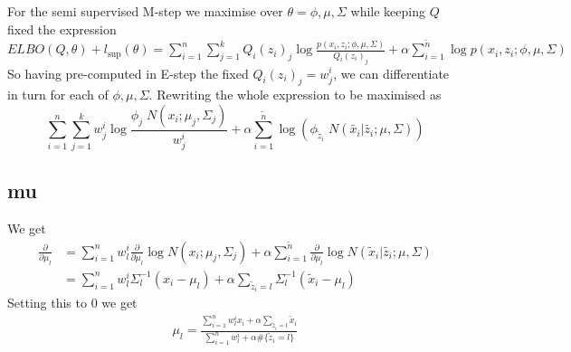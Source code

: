 %
%
\begin{answer}
For the semi supervised M-step we maximise over $\theta = \phi, \mu, \Sigma$ while keeping $Q$ fixed the expression $ELBO(Q, \theta) + l_{\text{sup}}(\theta) = \sum_{i=1}^n \sum_{j=1}^k Q_i(z_i)_j \log \frac{p(x_i,z_i; \phi, \mu, \Sigma)}{Q_i(z_i)_j} + \alpha \sum_{i=1}^{\tilde{n}} \log p(x_i, z_i; \phi, \mu, \Sigma)$
\linebreak
So having pre-computed in E-step the fixed $Q_i(z_i)_j = w^i_j$, we can differentiate in turn for each of $\phi, \mu, \Sigma$. Rewriting the whole expression to be maximised as
\begin{equation*}
\sum_{i=1}^n \sum_{j=1}^k w^i_j \log \frac{\phi_j \; N(x_i ; \mu_j, \Sigma_j)}{w^i_j} + \alpha \sum_{i=1}^{\tilde{n}} \log  \left ( \phi_{\tilde{z}_i} \; N(\tilde{x_i} | \tilde{z_i}; \mu, \Sigma) \right )
\end{equation*}
\subsection*{mu}
We get
\begin{align*}
\frac{\partial}{\partial \mu_l} &=
\sum_{i=1}^n w^i_l \frac{\partial}{\partial \mu_l} \log  N(x_i ; \mu_j, \Sigma_j) +
\alpha \sum_{i=1}^{\tilde{n}} \frac{\partial}{\partial \mu_l} \log N(\tilde{x}_i | \tilde{z_i}; \mu, \Sigma)
\\
&= \sum_{i=1}^n w^i_l \Sigma_l^{-1} (x_i - \mu_l) + 
\alpha \sum_{\tilde{z}_i = l} \Sigma_l^{-1} (\tilde{x}_i - \mu_l)
\end{align*}
Setting this to $0$ we get
\begin{align*}
\mu_l =
\frac{
	\sum_{i=1}^n w^i_l x_i + \alpha \sum_{\tilde{z}_i = l} \tilde{x}_i
}
{
	\sum_{i=1}^n w^i_l + \alpha \#\{\tilde{z}_i = l\}
}
\end{align*}

\end{answer}
